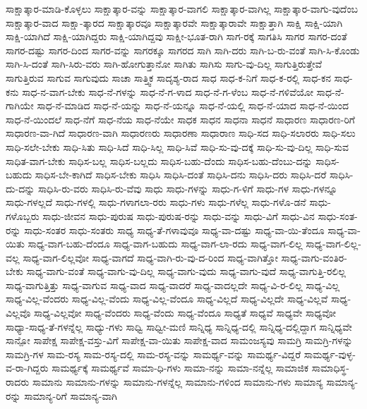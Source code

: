 {ಸಾಕ್ಷಾತ್ಕಾರ-ಮಾಡಿ-ಕೊಳ್ಳಲು
ಸಾಕ್ಷಾತ್ಕಾರ-ವನ್ನು
ಸಾಕ್ಷಾತ್ಕಾರ-ವಾಗಲಿ
ಸಾಕ್ಷಾತ್ಕಾರ-ವಾಗಿಲ್ಲ
ಸಾಕ್ಷಾತ್ಕಾರ-ವಾಗು-ವುದೆಂಬ
ಸಾಕ್ಷಾತ್ಕಾರ-ವಾದ
ಸಾಕ್ಷಾ-ತ್ಕಾರದ
ಸಾಕ್ಷಾತ್ಕಾರವೂ
ಸಾಕ್ಷಾತ್ಕಾರವೇ
ಸಾಕ್ಷಾತ್ಕಾರಾವೇ
ಸಾಕ್ಷಾತ್ತಾಗಿ
ಸಾಕ್ಷಿ
ಸಾಕ್ಷಿ-ಯಾಗಿ
ಸಾಕ್ಷಿ-ಯಾಗಿದೆ
ಸಾಕ್ಷಿ-ಯಾಗಿದ್ದರು
ಸಾಕ್ಷಿ-ಯಾಗಿದ್ದವು
ಸಾಕ್ಷೀ-ಭೂತ-ರಾಗಿ
ಸಾಗ-ರಕ್ಕೆ
ಸಾಗತಿಸಿ
ಸಾಗರ
ಸಾಗರ-ದಂತೆ
ಸಾಗರ-ದಷ್ಟು
ಸಾಗರ-ದಿಂದ
ಸಾಗರ-ವನ್ನು
ಸಾಗರಕ್ಕೂ
ಸಾಗರದ
ಸಾಗಿ
ಸಾಗಿ-ದರು
ಸಾಗಿ-ಬ-ರು-ವಂತೆ
ಸಾಗಿ-ಸಿ-ಕೊಂಡು
ಸಾಗಿ-ಸಿ-ದಂತೆ
ಸಾಗಿ-ಸಿರು-ವರು
ಸಾಗಿ-ಹೋಗುತ್ತಾನೋ
ಸಾಗಿತು
ಸಾಗಿಸು
ಸಾಗು-ವು-ದಿಲ್ಲ
ಸಾಗುತ್ತಿರುತ್ತೇವೆ
ಸಾಗುತ್ತಿರುವ
ಸಾಗುವ
ಸಾಗುವುದು
ಸಾಚಾ
ಸಾತ್ತ್ವಿಕ
ಸಾದೃಶ್ಯ-ರಾದ
ಸಾಧ
ಸಾಧ-ಕ-ನಿಗೆ
ಸಾಧ-ಕ-ರಲ್ಲಿ
ಸಾಧ-ಕನ
ಸಾಧ-ಕನು
ಸಾಧ-ನ-ವಾಗ-ಬೇಕು
ಸಾಧ-ನೆ-ಗಳನ್ನು
ಸಾಧ-ನೆ-ಗ-ಳಾದ
ಸಾಧ-ನೆ-ಗ-ಳೆಂಬ
ಸಾಧ-ನೆ-ಗಳಿವೆಯೋ
ಸಾಧ-ನೆ-ಗಾಗಿಯೇ
ಸಾಧ-ನೆ-ಮಾಡಿದ
ಸಾಧ-ನೆ-ಯನ್ನು
ಸಾಧ-ನೆ-ಯನ್ನೂ
ಸಾಧ-ನೆ-ಯಲ್ಲಿ
ಸಾಧ-ನೆ-ಯಾದ
ಸಾಧ-ನೆ-ಯಿಂದ
ಸಾಧ-ನೆ-ಯಿಂದಲೆ
ಸಾಧ-ನೆಗೆ
ಸಾಧ-ನೆಯ
ಸಾಧ-ನೆಯೇ
ಸಾಧಕ
ಸಾಧನ
ಸಾಧನಾ
ಸಾಧನೆ
ಸಾಧಾರಣ
ಸಾಧಾರಣ-ರಿಗೆ
ಸಾಧಾರಣ-ವಾ-ಗಿದೆ
ಸಾಧಾರಣ-ವಾಗಿ
ಸಾಧಾರಣರು
ಸಾಧಾರಣಾ
ಸಾಧಾರಾಣ
ಸಾಧಿ-ಸದ
ಸಾಧಿ-ಸಲಾರರು
ಸಾಧಿ-ಸಲು
ಸಾಧಿ-ಸಲೇ-ಬೇಕು
ಸಾಧಿ-ಸಿತು
ಸಾಧಿ-ಸಿದೆ
ಸಾಧಿ-ಸಿಲ್ಲ
ಸಾಧಿ-ಸಿವೆ
ಸಾಧಿ-ಸು-ವು-ದಕ್ಕೆ
ಸಾಧಿ-ಸು-ವು-ದಿಲ್ಲ
ಸಾಧಿ-ಸುವ
ಸಾಧಿತ-ವಾಗ-ಬೇಕು
ಸಾಧಿಸ-ಬಲ್ಲ
ಸಾಧಿಸ-ಬಲ್ಲದು
ಸಾಧಿಸ-ಬಹು-ದೆಂದು
ಸಾಧಿಸ-ಬಹು-ದೆಂಬು-ದನ್ನು
ಸಾಧಿಸ-ಬಹುದು
ಸಾಧಿಸ-ಬೇ-ಕಾಗಿದೆ
ಸಾಧಿಸ-ಬೇಕು
ಸಾಧಿಸಿ
ಸಾಧಿಸಿ-ದಂತೆ
ಸಾಧಿಸಿ-ದನು
ಸಾಧಿಸಿ-ದರು
ಸಾಧಿಸಿ-ದರೆ
ಸಾಧಿಸಿ-ದು-ದನ್ನು
ಸಾಧಿಸಿ-ರು-ವರು
ಸಾಧಿಸಿ-ರು-ವೆವು
ಸಾಧು
ಸಾಧು-ಗಳನ್ನು
ಸಾಧು-ಗ-ಳಿಗೆ
ಸಾಧು-ಗಳ
ಸಾಧು-ಗಳನ್ನೂ
ಸಾಧು-ಗಳಲ್ಲದೆ
ಸಾಧು-ಗಳಲ್ಲಿ
ಸಾಧು-ಗಳಾಗಲಾ-ರರು
ಸಾಧು-ಗಳು
ಸಾಧು-ಗಳೆಲ್ಲ
ಸಾಧು-ಗಳೊ-ಡನೆ
ಸಾಧು-ಗಳೊಬ್ಬರು
ಸಾಧು-ಜೀವನ
ಸಾಧು-ಪುರುಷ
ಸಾಧು-ಪುರುಷ-ರನ್ನು
ಸಾಧು-ವನ್ನು
ಸಾಧು-ವಿಗೆ
ಸಾಧು-ವಿನ
ಸಾಧು-ಸಂತ-ರನ್ನು
ಸಾಧು-ಸಂತರ
ಸಾಧು-ಸಂತರು
ಸಾಧ್ಯ
ಸಾಧ್ಯ-ತೆ-ಗಳಾವುವೂ
ಸಾಧ್ಯ-ವಾ-ದಷ್ಟು
ಸಾಧ್ಯ-ವಾ-ಯಿ-ತೆಂದೂ
ಸಾಧ್ಯ-ವಾ-ಯಿತು
ಸಾಧ್ಯ-ವಾಗ-ಬಹು-ದೆಂದೂ
ಸಾಧ್ಯ-ವಾಗ-ಬಹುದು
ಸಾಧ್ಯ-ವಾಗ-ಲಾ-ರದು
ಸಾಧ್ಯ-ವಾಗ-ಲಿಲ್ಲ
ಸಾಧ್ಯ-ವಾಗ-ಲಿಲ್ಲ-ವಲ್ಲ
ಸಾಧ್ಯ-ವಾಗ-ಲಿಲ್ಲವೋ
ಸಾಧ್ಯ-ವಾಗದೆ
ಸಾಧ್ಯ-ವಾಗಿ-ರು-ವು-ದ-ರಿಂದ
ಸಾಧ್ಯ-ವಾಗಿತ್ತೋ
ಸಾಧ್ಯ-ವಾಗು-ವಂತಿರ-ಬೇಕು
ಸಾಧ್ಯ-ವಾಗು-ವಂತೆ
ಸಾಧ್ಯ-ವಾಗು-ವು-ದಿಲ್ಲ
ಸಾಧ್ಯ-ವಾಗು-ವುದು
ಸಾಧ್ಯ-ವಾಗು-ವುದೆ
ಸಾಧ್ಯ-ವಾಗುತ್ತಿ-ರಲಿಲ್ಲ
ಸಾಧ್ಯ-ವಾಗುತ್ತಿತ್ತು
ಸಾಧ್ಯ-ವಾಗುವ
ಸಾಧ್ಯ-ವಾದ
ಸಾಧ್ಯ-ವಾದರೆ
ಸಾಧ್ಯ-ವಾದಲ್ಲದೇ
ಸಾಧ್ಯ-ವಿ-ರ-ಲಿಲ್ಲ
ಸಾಧ್ಯ-ವಿಲ್ಲ
ಸಾಧ್ಯ-ವಿಲ್ಲ-ವೆಂದರು
ಸಾಧ್ಯ-ವಿಲ್ಲ-ವೆಂದು
ಸಾಧ್ಯ-ವಿಲ್ಲ-ವೆಂದೂ
ಸಾಧ್ಯ-ವಿಲ್ಲದೆ
ಸಾಧ್ಯ-ವಿಲ್ಲದೇ
ಸಾಧ್ಯ-ವಿಲ್ಲವೆ
ಸಾಧ್ಯ-ವಿಲ್ಲವೊ
ಸಾಧ್ಯ-ವಿಲ್ಲವೋ
ಸಾಧ್ಯ-ವೆಂದರು
ಸಾಧ್ಯ-ವೆಂದು
ಸಾಧ್ಯ-ವೆಂದೂ
ಸಾಧ್ಯತೆ
ಸಾಧ್ಯವೆ
ಸಾಧ್ಯವೇ
ಸಾಧ್ಯವೋ
ಸಾಧ್ಯಾ-ಸಾಧ್ಯ-ತೆ-ಗಳನ್ನೆಲ್ಲ
ಸಾಧ್ಯು-ಗಳು
ಸಾಧ್ವಿ
ಸಾಧ್ವೀ-ಮಣಿ
ಸಾನ್ನಿಧ್ಯ
ಸಾನ್ನಿಧ್ಯ-ದಲ್ಲಿ
ಸಾನ್ನಿಧ್ಯ-ದಲ್ಲಿದ್ದಾಗ
ಸಾನ್ನಿಧ್ಯವೇ
ಸಾನ್ಪೋ
ಸಾಪೇಕ್ಷ
ಸಾಪೇಕ್ಷ-ವಸ್ತು-ವಿಗೆ
ಸಾಪೇಕ್ಷ-ವಾ-ಯಿತು
ಸಾಪೇಕ್ಷ-ವಾದ
ಸಾಮಂಜಸ್ಯವು
ಸಾಮಗ್ರಿ
ಸಾಮಗ್ರಿ-ಗಳನ್ನು
ಸಾಮಗ್ರಿ-ಗಳ
ಸಾಮ-ರಸ್ಯ
ಸಾಮ-ರಸ್ಯ-ದಲ್ಲಿ
ಸಾಮ-ರಸ್ಯ-ವನ್ನು
ಸಾಮರ್ಥ್ಯ-ವನ್ನು
ಸಾಮರ್ಥ್ಯ-ವಿದ್ದರೆ
ಸಾಮರ್ಥ್ಯ-ವುಳ್ಳ-ವ-ರಾ-ಗಿದ್ದರು
ಸಾಮರ್ಥ್ಯಕ್ಕೆ
ಸಾಮರ್ಥ್ಯವೆ
ಸಾಮಾ-ಧಿ-ಗಳು
ಸಾಮಾ-ನನ್ನು
ಸಾಮಾ-ನನ್ನೆಲ್ಲ
ಸಾಮಾಜಿಕ
ಸಾಮಾಧಿಸ್ಥ-ರಾದರು
ಸಾಮಾನು
ಸಾಮಾನು-ಗಳನ್ನು
ಸಾಮಾನು-ಗಳನ್ನೆಲ್ಲ
ಸಾಮಾನು-ಗಳಿಂದ
ಸಾಮಾನು-ಗಳು
ಸಾಮಾನ್ಯ
ಸಾಮಾನ್ಯ-ರನ್ನು
ಸಾಮಾನ್ಯ-ರಿಗೆ
ಸಾಮಾನ್ಯ-ವಾಗಿ
}

